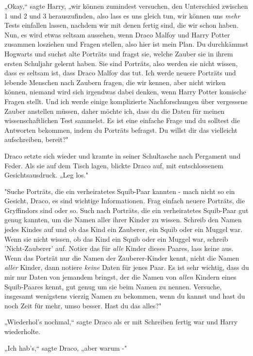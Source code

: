 {„Okay,“ sagte Harry, „wir können zumindest versuchen, den Unterschied zwischen 1 und 2 und 3 herauszufinden, also lass es uns gleich tun, wir können uns \emph{mehr} Tests einfallen lassen, nachdem wir mit denen fertig sind, die wir schon haben. Nun, es wird etwas seltsam aussehen, wenn Draco Malfoy und Harry Potter zusammen losziehen und Fragen stellen, also hier ist mein Plan. Du durchkämmst Hogwarts und suchst alte Porträts und fragst sie, welche Zauber sie in ihrem ersten Schuljahr gelernt haben. Sie sind Porträts, also werden sie nicht wissen, dass es seltsam ist, dass Draco Malfoy das tut. Ich werde neuere Porträts und lebende Menschen nach Zaubern fragen, die wir kennen, aber nicht wirken können, niemand wird sich irgendwas dabei denken, wenn Harry Potter komische Fragen stellt. Und ich werde einige komplizierte Nachforschungen über vergessene Zauber anstellen müssen, daher möchte ich, dass du die Daten für meinen wissenschaftlichen Test sammelst. Es ist eine einfache Frage und du solltest die Antworten bekommen, indem du Porträts befragst. Du willst dir das vielleicht aufschreiben, bereit?"

Draco setzte sich wieder und kramte in seiner Schultasche nach Pergament und Feder. Als sie auf dem Tisch lagen, blickte Draco auf, mit entschlossenem Gesichtsausdruck. „Leg los."

"Suche Porträts, die ein verheiratetes Squib-Paar kannten - mach nicht so ein Gesicht, Draco, es sind wichtige Informationen. Frag einfach neuere Porträts, die Gryffindors sind oder so. Such nach Porträts, die ein verheiratetes Squib-Paar gut genug kannten, um die Namen aller ihrer Kinder zu wissen. Schreib den Namen jedes Kindes auf und ob das Kind ein Zauberer, ein Squib oder ein Muggel war. Wenn sie nicht wissen, ob das Kind ein Squib oder ein Muggel war, schreib 'Nicht-Zauberer' auf. Notier das für \emph{alle} Kinder dieses Paares, lass keine aus. Wenn das Porträt nur die Namen der Zauberer-Kinder kennt, nicht die Namen \emph{aller} Kinder, dann notiere \emph{keine} Daten für jenes Paar. Es ist sehr wichtig, dass du mir nur Daten von jemandem bringst, der die Namen von \emph{allen} Kindern eines Squib-Paares kennt, gut genug um sie beim Namen zu nennen. Versuche, insgesamt wenigstens vierzig Namen zu bekommen, wenn du kannst und hast du noch Zeit für mehr, umso besser. Hast du das alles?"

„Wiederhol's nochmal,“ sagte Draco als er mit Schreiben fertig war und Harry wiederholte.

„Ich hab's,“ sagte Draco, „aber warum -"

}
